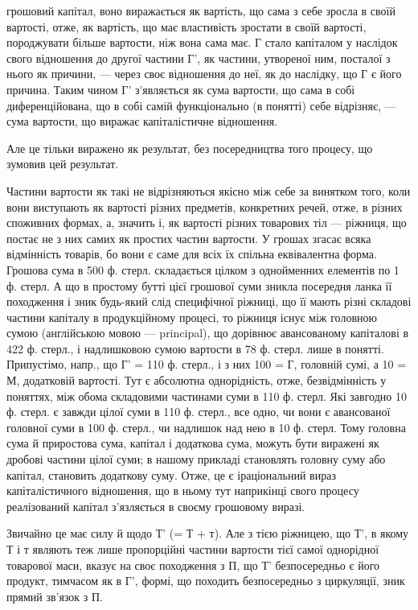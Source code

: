 \parcont{}  %
грошовий капітал, воно виражається як вартість, що сама з себе зросла
в своїй вартості, отже, як вартість, що має властивість зростати в своїй
вартості, породжувати більше вартости, ніж вона сама має. Г стало капіталом
у наслідок свого відношення до другої частини Г', як частини,
утвореної ним, посталої з нього як причини, — через своє відношення до
неї, як до наслідку, що Г є його причина. Таким чином Г' з’являється
як сума вартости, що сама в собі диференційована, що в собі самій функціонально
(в понятті) себе відрізняє, — сума вартости, що виражає капіталістичне
відношення.

Але це тільки виражено як результат, без посередництва того процесу,
що зумовив цей результат.

Частини вартости як такі не відрізняються якісно між себе за винятком
того, коли вони виступають як вартості різних предметів, конкретних
речей, отже, в різних споживних формах, а, значить і, як вартості
різних товарових тіл — ріжниця, що постає не з них самих як простих
частин вартости. У грошах згасає всяка відмінність товарів, бо вони є
саме для всіх їх спільна еквівалентна форма. Грошова сума в 500 ф.
стерл. складається цілком з однойменних елементів по 1 ф. стерл. А що
в простому бутті цієї грошової суми зникла посередня ланка її походження
і зник будь-який слід специфічної ріжниці, що її мають різні
складові частини капіталу в продукційному процесі, то ріжниця існує
між головною сумою (англійською мовою — principal), що дорівнює
авансованому капіталові в 422 ф. стерл., і надлишковою сумою вартости
в 78 ф. стерл. лише в понятті. Припустімо, напр., що Г' = 110 ф. стерл.,
і з них 100 = Г, головній сумі, а 10 = М, додатковій вартості. Тут
є абсолютна однорідність, отже, безвідмінність у поняттях, між обома
складовими частинами суми в 110 ф. стерл. Які завгодно 10 ф. стерл.
є завжди  цілої суми в 110 ф. стерл., все одно, чи вони є  авансованої
головної суми в 100 ф. стерл., чи надлишок над нею в 10 ф. стерл.
Тому головна сума й приростова сума, капітал і додаткова сума, можуть
бути виражені як дробові частини цілої суми; в нашому прикладі  становлять
головну суму або капітал,  становить додаткову суму. Отже, це є
іраціональний вираз капіталістичного відношення, що в ньому тут наприкінці
свого процесу реалізований капітал з’язляється в своєму грошовому виразі.

Звичайно це має силу й щодо Т' (= Т + т). Але з тією ріжницею, що
Т', в якому Т і т являють теж лише пропорційні частини вартости тієї
самої однорідної товарової маси, вказує на своє походження з П, що Т'
безпосередньо є його продукт, тимчасом як в Г', формі, що походить
безпосередньо з циркуляції, зник прямий зв’язок з П.

